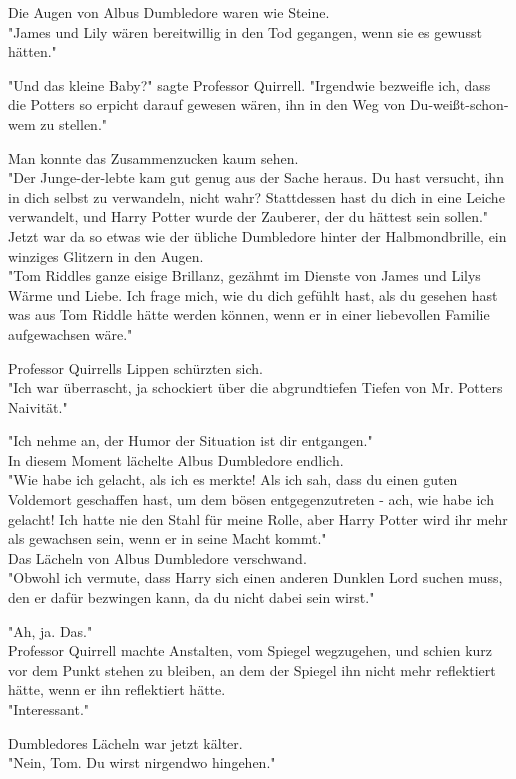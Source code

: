 {Die Augen von Albus Dumbledore waren wie Steine.\\ "James und Lily wären bereitwillig in den Tod gegangen, wenn sie es gewusst hätten."

"Und das kleine Baby?" sagte Professor Quirrell. "Irgendwie bezweifle ich, dass die Potters so erpicht darauf gewesen wären, ihn in den Weg von Du-weißt-schon-wem zu stellen."

Man konnte das Zusammenzucken kaum sehen.\\ "Der Junge-der-lebte kam gut genug aus der Sache heraus. Du hast versucht, ihn in dich selbst zu verwandeln, nicht wahr? Stattdessen hast du dich in eine Leiche verwandelt, und Harry Potter wurde der Zauberer, der du hättest sein sollen."\\ Jetzt war da so etwas wie der übliche Dumbledore hinter der Halbmondbrille, ein winziges Glitzern in den Augen.\\ "Tom Riddles ganze eisige Brillanz, gezähmt im Dienste von James und Lilys Wärme und Liebe. Ich frage mich, wie du dich gefühlt hast, als du gesehen hast was aus Tom Riddle hätte werden können, wenn er in einer liebevollen Familie aufgewachsen wäre."

Professor Quirrells Lippen schürzten sich.\\ "Ich war überrascht, ja schockiert über die abgrundtiefen Tiefen von Mr. Potters Naivität."

"Ich nehme an, der Humor der Situation ist dir entgangen."\\ In diesem Moment lächelte Albus Dumbledore endlich.\\ "Wie habe ich gelacht, als ich es merkte! Als ich sah, dass du einen guten Voldemort geschaffen hast, um dem bösen entgegenzutreten - ach, wie habe ich gelacht! Ich hatte nie den Stahl für meine Rolle, aber Harry Potter wird ihr mehr als gewachsen sein, wenn er in seine Macht kommt."\\ Das Lächeln von Albus Dumbledore verschwand.\\ "Obwohl ich vermute, dass Harry sich einen anderen Dunklen Lord suchen muss, den er dafür bezwingen kann, da du nicht dabei sein wirst."

"Ah, ja. Das."\\ Professor Quirrell machte Anstalten, vom Spiegel wegzugehen, und schien kurz vor dem Punkt stehen zu bleiben, an dem der Spiegel ihn nicht mehr reflektiert hätte, wenn er ihn reflektiert hätte.\\ "Interessant."

Dumbledores Lächeln war jetzt kälter.\\ "Nein, Tom. Du wirst nirgendwo hingehen."

}
